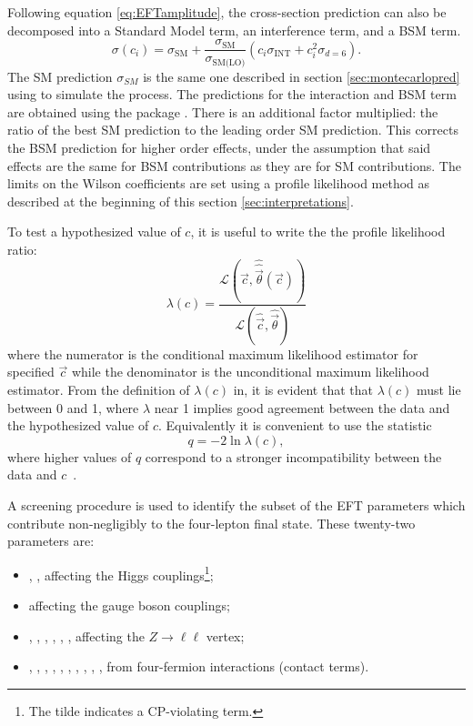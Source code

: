 Following equation \ref{eq:EFTamplitude}, the cross-section prediction can also be decomposed into a Standard Model term, an interference term, and a BSM term. 
\begin{equation} \label{eq:SMEFTXS}
 \sigma(c_i)= \sigma_{\text{SM}} + \frac{\sigma_{\text{SM}}}{\sigma_{\text{SM(LO)}}}(c_i \sigma_{\text{INT}} + c^2_i \sigma_{d=6}).
\end{equation}
The SM prediction $\sigma_{SM}$ is the same one described in section \ref{sec:montecarlopred} using \SHERPA to simulate the \qqFourL process. The predictions for the interaction and BSM term are obtained using the \SMEFTsim {} package \cite{SMEFTsim}. There is an additional factor multiplied: the ratio of the best SM prediction to the leading order SM prediction. This corrects the BSM prediction for higher order effects, under the assumption that said effects are the same for BSM contributions as they are for SM contributions. 
The limits on the Wilson coefficients are set using a profile likelihood method as described at the beginning of this section \ref{sec:interpretations}. 

To test a hypothesized value of $c$, it is useful to write the the profile likelihood ratio:
\begin{equation}
    \lambda(c) = \frac{\mathcal{L}( \vec{c}, \hat{\hat{\vec{\theta}}}(\vec{c})) } {\mathcal{L}(\hat{{\vec{c}}}, \hat{{\vec{\theta}}} )}
\end{equation}
where the numerator is the conditional maximum likelihood estimator for specified $\vec{c}$ while the denominator is the unconditional maximum likelihood estimator. 
From the definition of $\lambda(c)$ in, it is evident that that $\lambda(c)$ must lie between 0 and 1, where $\lambda$ near 1 implies good agreement between the data and the hypothesized value of $c$. Equivalently it is convenient to use the statistic
\begin{equation}\label{eq:lambda_simplified}
    q = - 2 \ln \lambda(c),
\end{equation}
where higher values of $q$ correspond to a stronger incompatibility between the data and $c$~\cite{Cowan_2011}.

A screening procedure is used to identify the subset of the EFT parameters which contribute non-negligibly to the four-lepton final state. These twenty-two parameters are:
\begin{itemize}
  \item \chg, \chgtil, \chdd affecting the Higgs couplings\footnote{The tilde indicates a CP-violating term.};
  \item \chwb affecting the gauge boson couplings;
  \item \chd, \chu, \che, \chlone, \chlthr, \chqone, \chqthr affecting the $Z\to \ell\ell$ vertex;
  \item \ced, \cee, \ceu, \cld, \cle, \cll, \cllone, \clqone, \clqthr, \clu, \cqe from four-fermion interactions (contact terms).
\end{itemize}

